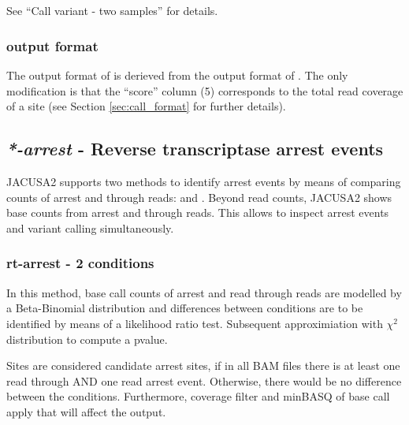 \documentclass[10pt,a4paper,final]{article}
\begin{document}
\subsection{\pileup}\label{sec:pileup}
See ``Call variant - two samples'' for details.
\subsubsection{\pileup output format}\label{sec:pileup_format}
The output format of \pileup is derieved from the output format of \call{*}. The only modification
is that the ``score'' column (5) corresponds to the total read coverage of a site (see Section
\ref{sec:call_format} for further details).
\subsection{\textit{*-arrest} - Reverse transcriptase arrest events}
JACUSA2 supports two methods to identify arrest events by means of comparing counts of arrest and through 
reads: \rtarrest and \lrtarrest. Beyond read counts, JACUSA2 shows base counts from arrest and through reads.
This allows to inspect arrest events and variant calling simultaneously.
\subsubsection{rt-arrest - 2 conditions}
In this method, base call counts of arrest and read through reads are modelled by a Beta-Binomial distribution and 
differences between conditions are to be identified by means of a likelihood ratio test. Subsequent approximiation 
with $\chi^2$ distribution to compute a pvalue.

Sites are considered candidate arrest sites, if in all BAM files there is at least one read through AND one  
read arrest event. Otherwise, there would be no difference between the conditions. 
Furthermore, coverage filter and minBASQ of base call apply that will affect the output. 
\end{document}
